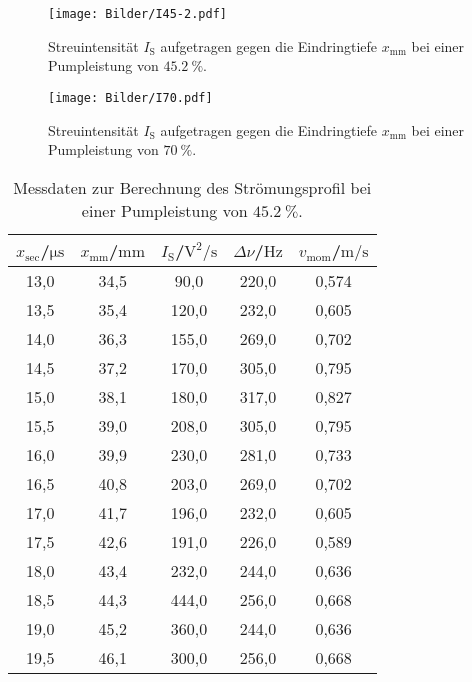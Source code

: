 \begin{figure}
  \centering
  \texttt{[image: Bilder/I45-2.pdf]}
  \caption{Streuintensität $I_\mathrm{S}$ aufgetragen gegen die Eindringtiefe $x_\mathrm{mm}$ bei einer Pumpleistung von $\SI{45.2}{\percent}$. }
  \label{fig:I45}
\end{figure}
\begin{figure}
  \centering
  \texttt{[image: Bilder/I70.pdf]}
  \caption{Streuintensität $I_\mathrm{S}$ aufgetragen gegen die Eindringtiefe $x_\mathrm{mm}$ bei einer Pumpleistung von $\SI{70}{\percent}$. }
  \label{fig:I70}
\end{figure}

\begin{table}
  \centering
  \caption{Messdaten zur Berechnung des Strömungsprofil bei einer Pumpleistung von $\SI{45.2}{\percent}$.}
  \label{tab:pl45}
  \begin{tabular}{ccccc}
    \toprule
    $x_\mathrm{sec}$/$\si{\micro\second}$ & $x_\mathrm{mm}$/$\si{\milli\meter}$ & $I_\mathrm{S}$/$\si{\square\volt\per\second}$ & $\Delta \nu$/$\si{\Hz}$&$v_\mathrm{mom}$/$\si{\meter\per\second}$ \\
    \midrule
    13,0 & 34,5 & 90,0 & 220,0 & 0,574 \\
    13,5 & 35,4 & 120,0 & 232,0 & 0,605 \\
    14,0 & 36,3 & 155,0 & 269,0 & 0,702 \\
    14,5 & 37,2 & 170,0 & 305,0 & 0,795 \\
    15,0 & 38,1 & 180,0 & 317,0 & 0,827 \\
    15,5 & 39,0 & 208,0 & 305,0 & 0,795 \\
    16,0 & 39,9 & 230,0 & 281,0 & 0,733 \\
    16,5 & 40,8 & 203,0 & 269,0 & 0,702 \\
    17,0 & 41,7 & 196,0 & 232,0 & 0,605 \\
    17,5 & 42,6 & 191,0 & 226,0 & 0,589 \\
    18,0 & 43,4 & 232,0 & 244,0 & 0,636 \\
    18,5 & 44,3 & 444,0 & 256,0 & 0,668 \\
    19,0 & 45,2 & 360,0 & 244,0 & 0,636 \\
    19,5 & 46,1 & 300,0 & 256,0 & 0,668 \\
    \bottomrule
  \end{tabular}
\end{table}
